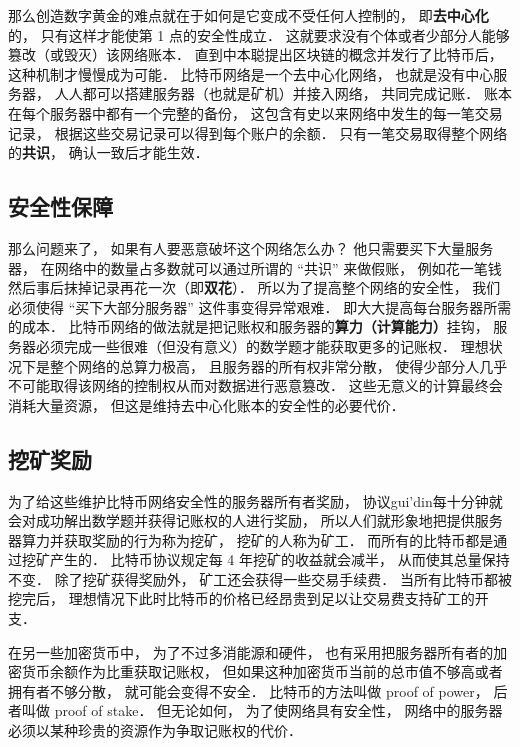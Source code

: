 那么创造数字黄金的难点就在于如何是它变成不受任何人控制的， 即\textbf{去中心化}的， 只有这样才能使第 1 点的安全性成立． 这就要求没有个体或者少部分人能够篡改（或毁灭）该网络账本． 直到中本聪提出区块链的概念并发行了比特币后， 这种机制才慢慢成为可能． 比特币网络是一个去中心化网络， 也就是没有中心服务器， 人人都可以搭建服务器（也就是矿机）并接入网络， 共同完成记账． 账本在每个服务器中都有一个完整的备份， 这包含有史以来网络中发生的每一笔交易记录， 根据这些交易记录可以得到每个账户的余额． 只有一笔交易取得整个网络的\textbf{共识}， 确认一致后才能生效．

\subsection{安全性保障}
那么问题来了， 如果有人要恶意破坏这个网络怎么办？ 他只需要买下大量服务器， 在网络中的数量占多数就可以通过所谓的 “共识” 来做假账， 例如花一笔钱然后事后抹掉记录再花一次（即\textbf{双花}）． 所以为了提高整个网络的安全性， 我们必须使得 “买下大部分服务器” 这件事变得异常艰难． 即大大提高每台服务器所需的成本． 比特币网络的做法就是把记账权和服务器的\textbf{算力（计算能力）}挂钩， 服务器必须完成一些很难（但没有意义）的数学题才能获取更多的记账权． 理想状况下是整个网络的总算力极高， 且服务器的所有权非常分散， 使得少部分人几乎不可能取得该网络的控制权从而对数据进行恶意篡改． 这些无意义的计算最终会消耗大量资源， 但这是维持去中心化账本的安全性的必要代价．

\subsection{挖矿奖励}
为了给这些维护比特币网络安全性的服务器所有者奖励， 协议gui'din每十分钟就会对成功解出数学题并获得记账权的人进行奖励， 所以人们就形象地把提供服务器算力并获取奖励的行为称为挖矿， 挖矿的人称为矿工． 而所有的比特币都是通过挖矿产生的． 比特币协议规定每 4 年挖矿的收益就会减半， 从而使其总量保持不变． 除了挖矿获得奖励外， 矿工还会获得一些交易手续费． 当所有比特币都被挖完后， 理想情况下此时比特币的价格已经昂贵到足以让交易费支持矿工的开支．

在另一些加密货币中， 为了不过多消能源和硬件， 也有采用把服务器所有者的加密货币余额作为比重获取记账权， 但如果这种加密货币当前的总市值不够高或者拥有者不够分散， 就可能会变得不安全． 比特币的方法叫做 proof of power， 后者叫做 proof of stake． 但无论如何， 为了使网络具有安全性， 网络中的服务器必须以某种珍贵的资源作为争取记账权的代价．
